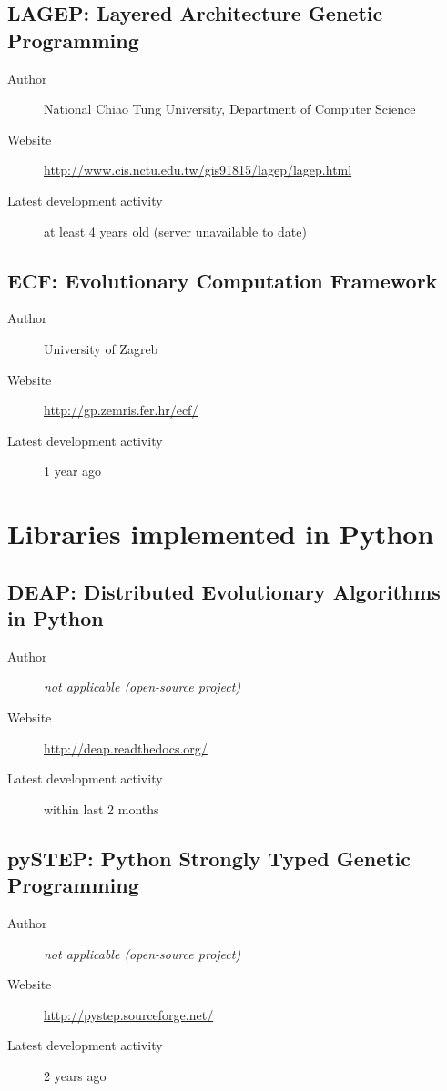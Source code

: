 \subsection*{LAGEP: Layered Architecture Genetic Programming}
\begin{description}
    \item[Author] National Chiao Tung University, Department of Computer Science
    \item[Website] \url{http://www.cis.nctu.edu.tw/gis91815/lagep/lagep.html}
    \item[Latest development activity] at least 4 years old (server unavailable to date)
\end{description}


\subsection*{ECF: Evolutionary Computation Framework}
\begin{description}
    \item[Author] University of Zagreb
    \item[Website] \url{http://gp.zemris.fer.hr/ecf/}
    \item[Latest development activity] 1 year ago
\end{description}


\section{Libraries implemented in Python}
\subsection*{DEAP: Distributed Evolutionary Algorithms in Python}
\begin{description}
    \item[Author] \textit{not applicable (open-source project)}
    \item[Website] \url{http://deap.readthedocs.org/}
    \item[Latest development activity] within last 2 months
\end{description}


\subsection*{pySTEP: Python Strongly Typed Genetic Programming}
\begin{description}
    \item[Author] \textit{not applicable (open-source project)}
    \item[Website] \url{http://pystep.sourceforge.net/}
    \item[Latest development activity] 2 years ago
\end{description}



